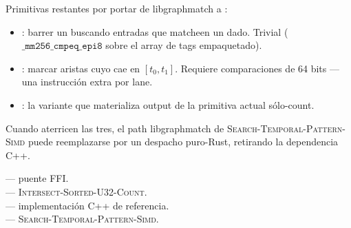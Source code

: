 Primitivas restantes por portar de libgraphmatch a
:
\begin{itemize}
    \item {}: barrer un
        \code{\&[CompactRelation]} buscando entradas que
        matcheen un  dado. Trivial
        ($\texttt{\_mm256\_cmpeq\_epi8}$ sobre el array de tags
        empaquetado).
    \item {}: marcar aristas cuyo
         cae en $[t_0, t_1]$. Requiere
        comparaciones de 64 bits --- una instrucción extra por
        lane.
    \item {}: la variante que
        materializa output de la primitiva actual sólo-count.
\end{itemize}

Cuando aterricen las tres, el path libgraphmatch de
\textsc{Search-Temporal-Pattern-Simd} puede reemplazarse por un
despacho puro-Rust, retirando la dependencia C++.

\begin{inthecode}
 --- puente
FFI.\\
 ---
\textsc{Intersect-Sorted-U32-Count}.\\
 --- implementación
C++ de referencia.\\
 ---
\textsc{Search-Temporal-Pattern-Simd}.
\end{inthecode}
